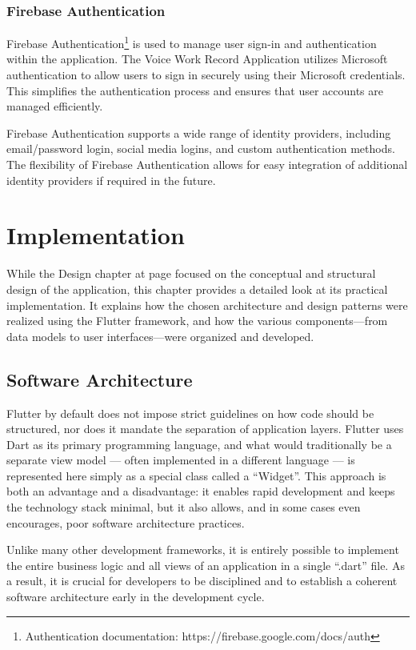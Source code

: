 \documentclass[
  digital,     %
  oneside,     %
  nosansbold,  %
  nocolorbold, %
  lof,         %
  lot,         %
]{fithesis4}
\begin{document}
\subsection{Firebase Authentication}
Firebase Authentication\footnote{Authentication documentation: https://firebase.google.com/docs/auth} is used to manage user sign-in and authentication within the application. The Voice Work Record Application utilizes Microsoft authentication to allow users to sign in securely using their Microsoft credentials. This simplifies the authentication process and ensures that user accounts are managed efficiently.

Firebase Authentication supports a wide range of identity providers, including email/password login, social media logins, and custom authentication methods. The flexibility of Firebase Authentication allows for easy integration of additional identity providers if required in the future.

\chapter{Implementation}

While the Design chapter at page \pageref{chap:design} focused on the conceptual and structural design of the application, this chapter provides a detailed look at its practical implementation. It explains how the chosen architecture and design patterns were realized using the Flutter framework, and how the various components—from data models to user interfaces—were organized and developed.

\section{Software Architecture}
Flutter by default does not impose strict guidelines on how code should be structured, nor does it mandate the separation of application layers. Flutter uses Dart as its primary programming language, and what would traditionally be a separate view model --- often implemented in a different language --- is represented here simply as a special class called a ``Widget''. This approach is both an advantage and a disadvantage: it enables rapid development and keeps the technology stack minimal, but it also allows, and in some cases even encourages, poor software architecture practices.

Unlike many other development frameworks, it is entirely possible to implement the entire business logic and all views of an application in a single ``.dart'' file. As a result, it is crucial for developers to be disciplined and to establish a coherent software architecture early in the development cycle.
\end{document}
